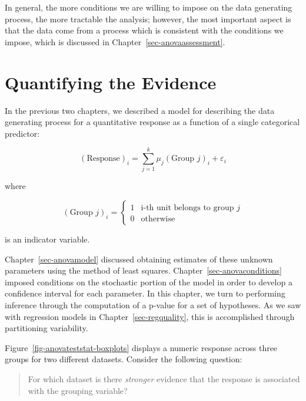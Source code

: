 \documentclass[
  letterpaper,
  DIV=11,
  numbers=noendperiod]{scrreprt}
\theoremstyle{definition}
\theoremstyle{definition}
\theoremstyle{plain}
\theoremstyle{remark}
\begin{document}
In general, the more conditions we are willing to impose on the data
generating process, the more tractable the analysis; however, the most
important aspect is that the data come from a process which is
consistent with the conditions we impose, which is discussed in
Chapter~\ref{sec-anovaassessment}.

\hypertarget{sec-anovateststat}{%
\chapter{Quantifying the Evidence}\label{sec-anovateststat}}

In the previous two chapters, we described a model for describing the
data generating process for a quantitative response as a function of a
single categorical predictor:

\[(\text{Response})_i = \sum_{j = 1}^{k} \mu_j (\text{Group } j)_i + \varepsilon_i\]

where

\[(\text{Group } j)_i = \begin{cases} 1 & \text{i-th unit belongs to group } j \\ 0 & \text{otherwise} \end{cases}\]

is an indicator variable.

Chapter~\ref{sec-anovamodel} discussed obtaining estimates of these
unknown parameters using the method of least squares.
Chapter~\ref{sec-anovaconditions} imposed conditions on the stochastic
portion of the model in order to develop a confidence interval for each
parameter. In this chapter, we turn to performing inference through the
computation of a p-value for a set of hypotheses. As we saw with
regression models in Chapter~\ref{sec-regquality}, this is accomplished
through partitioning variability.

Figure~\ref{fig-anovateststat-boxplots} displays a numeric response
across three groups for two different datasets. Consider the following
question:

\begin{quote}
For which dataset is there \emph{stronger} evidence that the response is
associated with the grouping variable?
\end{quote}
\end{document}
